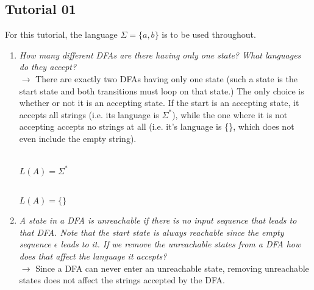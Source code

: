 \documentclass[11pt]{article}
\begin{document}
\subsection{Tutorial 01}
For this tutorial, the language $\Sigma = \{a, b \}$ is to be used throughout.
\begin{enumerate}
  \item \textit{How many different DFAs are there having only one state? What languages do they accept?} \\
  $\to$ There are exactly two DFAs having only one state (such a state is the start state and both transitions must loop on that state.) The only choice is whether or 
  not it is an accepting state. If the start is an accepting state, it accepts all strings (i.e. its language is $\Sigma ^*$), while the one where it is not accepting accepts
  no strings at all (i.e. it's language is \{\}, which does not even include the empty string).

\begin{minipage}{0.45\textwidth}
    \centering
    \\
    $L(A) = \Sigma ^*$
\end{minipage}
\hfill
\begin{minipage}{0.45\textwidth}
    \centering
    \\
    $L(A) = \{\}$
\end{minipage}

  \item \textit{A state in a DFA is \textit{unreachable} if there is no input sequence that leads to that DFA. Note that the start state is always reachable
  since the empty sequence $\epsilon$ leads to it. If we remove the unreachable states from a DFA how does that affect the language it accepts?} \\
  $\to$ Since a DFA can never enter an unreachable state, removing unreachable states does not affect the strings accepted by the DFA.


\end{enumerate}
\end{document}
